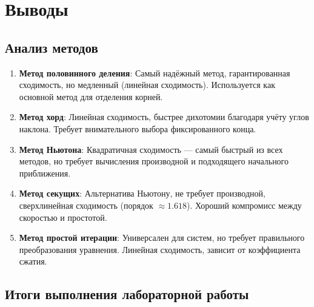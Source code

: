 \documentclass[a4paper,12pt]{article}
\begin{document}
\newpage

\section{Выводы}

\subsection{Анализ методов}

\begin{enumerate}
    \item \textbf{Метод половинного деления}: Самый надёжный метод, гарантированная сходимость, но медленный (линейная сходимость). Используется как основной метод для отделения корней.
    
    \item \textbf{Метод хорд}: Линейная сходимость, быстрее дихотомии благодаря учёту углов наклона. Требует внимательного выбора фиксированного конца.
    
    \item \textbf{Метод Ньютона}: Квадратичная сходимость --- самый быстрый из всех методов, но требует вычисления производной и подходящего начального приближения.
    
    \item \textbf{Метод секущих}: Альтернатива Ньютону, не требует производной, сверхлинейная сходимость (порядок $\approx 1.618$). Хороший компромисс между скоростью и простотой.
    
    \item \textbf{Метод простой итерации}: Универсален для систем, но требует правильного преобразования уравнения. Линейная сходимость, зависит от коэффициента сжатия.
\end{enumerate}

\subsection{Итоги выполнения лабораторной работы}
\end{document}

